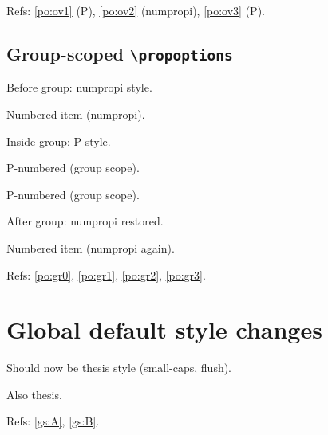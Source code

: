 \documentclass{article}
\begin{document}

Refs: \ref{po:ov1} (P), \ref{po:ov2} (numpropi), \ref{po:ov3} (P).

\subsection{Group-scoped \texttt{\textbackslash propoptions}}


Before group: numpropi style.
\begin{prop}
  \item Numbered item (numpropi). \label{po:gr0}
\end{prop}

\begingroup
  Inside group: P style.
  \begin{prop}
    \item P-numbered (group scope). \label{po:gr1}
    \item P-numbered (group scope). \label{po:gr2}
  \end{prop}
\endgroup

After group: numpropi restored.
\begin{prop}
  \item Numbered item (numpropi again). \label{po:gr3}
\end{prop}

Refs: \ref{po:gr0}, \ref{po:gr1}, \ref{po:gr2}, \ref{po:gr3}.

\section{Global default style changes}


\begin{prop}
  \item[First Claim] Should now be thesis style (small-caps, flush). \label{gs:A}
  \item[Second Claim] Also thesis. \label{gs:B}
\end{prop}

Refs: \ref{gs:A}, \ref{gs:B}.
\end{document}
